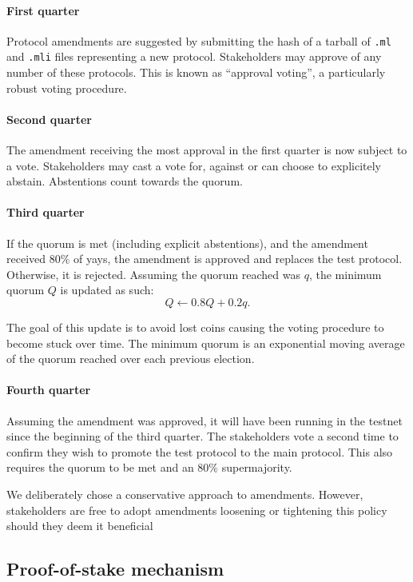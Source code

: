 \documentclass[letterpaper]{article}
\begin{document}
\paragraph{First quarter}
Protocol amendments are suggested by submitting the hash of a tarball of
\verb!.ml! and \verb!.mli! files representing a new protocol. Stakeholders may
approve of any number of these protocols. This is known as ``approval voting'',
a particularly robust voting procedure.

\paragraph{Second quarter}
The amendment receiving the most approval in the first quarter is now subject to
a vote. Stakeholders may cast a vote for, against or can choose to explicitely
abstain. Abstentions count towards the quorum.

\paragraph{Third quarter} If the quorum is met (including explicit abstentions),
and the amendment received $80\%$ of yays, the amendment is approved and
replaces the test protocol. Otherwise, it is rejected.
Assuming the quorum reached was $q$, the minimum quorum $Q$ is updated as such:
$$Q \leftarrow 0.8 Q + 0.2 q.$$

The goal of this update is to avoid lost coins causing the voting procedure to
become stuck over time. The minimum quorum is an exponential moving average of
the quorum reached over each previous election.

\paragraph{Fourth quarter} Assuming the amendment was approved, it will have
been running in the testnet since the beginning of the third quarter.
The stakeholders vote a second time to confirm they wish to promote the test
protocol to the main protocol. This also requires the quorum to be met and an
$80\%$ supermajority.

We deliberately chose a conservative approach to amendments. However,
stakeholders are free to adopt amendments loosening or tightening this policy 
should they deem it beneficial

\subsection{Proof-of-stake mechanism}
\end{document}
